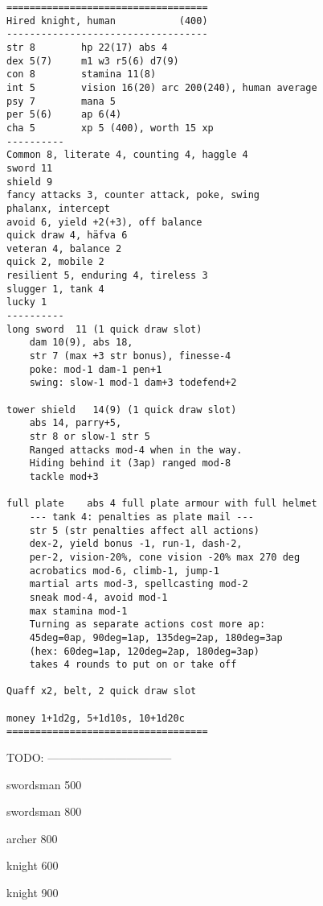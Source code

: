 \goodbreak \begin{samepage} \small \begin{verbatim}
===================================
Hired knight, human           (400)
-----------------------------------
str	8        hp 22(17) abs 4
dex	5(7)     m1 w3 r5(6) d7(9)
con	8        stamina 11(8)
int 5        vision 16(20) arc 200(240), human average
psy	7        mana 5
per	5(6)     ap 6(4)
cha	5        xp 5 (400), worth 15 xp
----------
Common 8, literate 4, counting 4, haggle 4
sword 11
shield 9
fancy attacks 3, counter attack, poke, swing
phalanx, intercept
avoid 6, yield +2(+3), off balance
quick draw 4, häfva 6
veteran 4, balance 2
quick 2, mobile 2
resilient 5, enduring 4, tireless 3
slugger 1, tank 4
lucky 1
----------
long sword  11 (1 quick draw slot)
    dam 10(9), abs 18,
    str 7 (max +3 str bonus), finesse-4
    poke: mod-1 dam-1 pen+1
    swing: slow-1 mod-1 dam+3 todefend+2

tower shield   14(9) (1 quick draw slot)
    abs 14, parry+5,
    str 8 or slow-1 str 5
    Ranged attacks mod-4 when in the way.
    Hiding behind it (3ap) ranged mod-8
    tackle mod+3

full plate    abs 4 full plate armour with full helmet 	
    --- tank 4: penalties as plate mail ---
    str 5 (str penalties affect all actions)
    dex-2, yield bonus -1, run-1, dash-2,
    per-2, vision-20%, cone vision -20% max 270 deg
    acrobatics mod-6, climb-1, jump-1
    martial arts mod-3, spellcasting mod-2
    sneak mod-4, avoid mod-1
    max stamina mod-1
    Turning as separate actions cost more ap:
    45deg=0ap, 90deg=1ap, 135deg=2ap, 180deg=3ap
    (hex: 60deg=1ap, 120deg=2ap, 180deg=3ap)
    takes 4 rounds to put on or take off

Quaff x2, belt, 2 quick draw slot

money 1+1d2g, 5+1d10s, 10+1d20c
===================================
\end{verbatim} \normalsize \end{samepage}





TODO: ---------------------------------
\clearpage

\todo swordsman 500

\todo swordsman 800

\todo archer 800

\todo knight 600

\todo knight 900








%
\flushbottom
